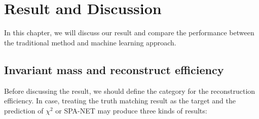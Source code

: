\chapter{Result and Discussion} \label{Discussion}

In this chapter, we will discuss our result and compare the performance between the traditional method and machine learning approach.

\section{Invariant mass and reconstruct efficiency }\label{sec:inv mass and reco eff}

Before discussing the result, we should define the category for the reconstruction efficiency. In case, treating the truth matching result as the target and the prediction of $\chi^{2}$ or SPA-NET may produce three kinds of results:

